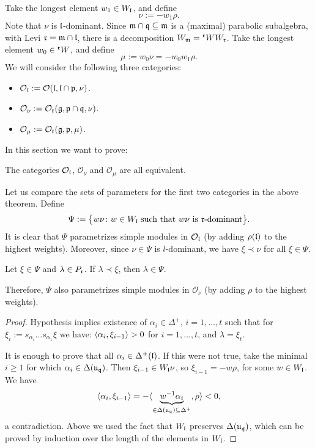 \documentclass[a4paper,10pt]{article}
\begin{document}
Take the longest element $w_1 \in W_{\mathfrak{l}}$, and define
%
\[ \nu := - w_1 \rho. \]
%
Note that $\nu$ is $\mathfrak{l}$-dominant. Since $\mathfrak{m \cap q \subseteq m}$ is a (maximal) parabolic subalgebra, with Levi $\mathfrak{r = m \cap l}$, there is a decomposition $W_{\mathfrak{m}} = {}^{\mathfrak{r}}W W_{\mathfrak{r}}$. Take the longest element $w_0 \in {}^{\mathfrak{r}}W$, and define
%
\[ \mu := w_0 \nu = - w_0 w_1 \rho. \]
%
We will consider the following three categories:
\begin{itemize}
\item $\mathcal{O}_{\mathfrak{l}} := \mathcal{O}(\mathfrak{l},\mathfrak{l \cap p},\nu)$.

\item $\mathcal{O}_{\nu} := \mathcal{O}_t(\mathfrak{g},\mathfrak{p\cap q},\nu)$.

\item $\mathcal{O}_{\mu} := \mathcal{O}_t(\mathfrak{g},\mathfrak{p},\mu)$.
\end{itemize}
%
In this section we want to prove:
%
\begin{theorem}[ES2]
\label{theorem:es2}
The categories $\mathcal{O}_{\mathfrak{l}}$, $\mathcal{O}_\nu$ and $\mathcal{O}_\mu$ are all equivalent.
\end{theorem}

Let us compare the sets of parameters for the first two categories in the above theorem. Define
%
\[ \Psi := \big\{ w \nu \colon w \in W_{\mathfrak{l}} \text{ such that $w \nu$ is $\mathfrak{r}$-dominant}  \big\}. \]
%
It is clear that $\Psi$ parametrizes simple modules in $\mathcal{O}_{\mathfrak{l}}$ (by adding $\rho(\mathfrak{l})$ to the highest weights). Moreover, since $\nu \in \Psi$ is $l$-dominant, we have $\xi \prec \nu$ for all $\xi \in \Psi$.
%
\begin{lemma}
\label{lemma:Psi_12}
Let $\xi \in \Psi$ and $\lambda \in P_{\mathfrak{r}}$. If $\lambda \prec \xi$, then $\lambda \in \Psi$.

Therefore, $\Psi$ also parametrizes simple modules in $\mathcal{O}_\nu$ (by adding $\rho$ to the highest weights).
\end{lemma}
%
\begin{proof}
Hypothesis implies existence of $\alpha_i \in \Delta^+$, $i=1,\ldots,t$ such that for $\xi_i:=s_{\alpha_i} \ldots s_{\alpha{_1}} \xi$ we have: $\langle \alpha_i, \xi_{i-1} \rangle >0$ for $i=1,\ldots,t$, and $\lambda=\xi_t$.

It is enough to prove that all $\alpha_i \in \Delta^+(\mathfrak{l})$. If this were not true, take the minimal $i\geq 1$ for which $\alpha_i \in \Delta(\mathfrak{u_q})$. Then $\xi_{i-1} \in W_{\mathfrak{l}} \nu$, so $\xi_{i-1}=-w\rho$, for some $w \in W_{\mathfrak{l}}$. We have
%
\[ \langle \alpha_i, \xi_{i-1} \rangle = - \langle \underbrace{w^{-1} \alpha_i}_{\in \Delta(\mathfrak{u_q}) \subseteq \Delta^+}, \rho \rangle < 0,\]
%
a contradiction. Above we used the fact that $W_{\mathfrak{l}}$ preserves $\Delta(\mathfrak{u_q})$, which can be proved by induction over the length of the elements in $W_{\mathfrak{l}}$.
\end{proof}
\end{document}
